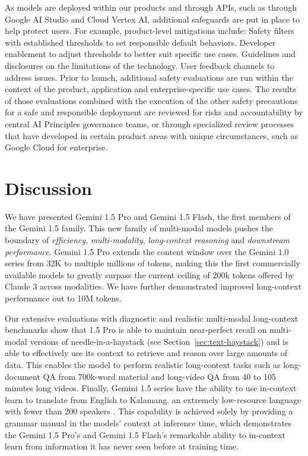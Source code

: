 As models are deployed within our products and through APIs, such as through Google AI Studio and Cloud Vertex AI, additional safeguards  are put in place to help protect users. For example, product-level mitigations include: Safety filters with established thresholds to set responsible default behaviors. Developer enablement to adjust thresholds to better suit specific use cases. Guidelines and disclosures on the limitations of the technology. User feedback channels to address issues. Prior to launch, additional safety evaluations are run within the context of the product, application and enterprise-specific use cases. The results of those evaluations combined with the execution of the other safety precautions for a safe and responsible deployment are reviewed for risks and accountability by central AI Principles governance teams, or through specialized review processes that have developed in certain product areas with unique circumstances, such as Google Cloud for enterprise. 

\section{Discussion}
\label{discussion}

We have presented Gemini 1.5 Pro and Gemini 1.5 Flash, the first members of the Gemini 1.5 family. This new family of multi-modal models pushes the boundary of \textit{efficiency}, \textit{multi-modality}, \textit{long-context reasoning} and \textit{downstream performance}. Gemini 1.5 Pro extends the content window over the Gemini 1.0 series from 32K to multiple millions of tokens, making this the first commercially available models to greatly surpass the current ceiling of 200k tokens offered by Claude 3 across modalities. We have further demonstrated improved long-context performance out to 10M tokens.

Our extensive evaluations with diagnostic and realistic multi-modal long-context benchmarks show that 1.5 Pro is able to maintain near-perfect recall on multi-modal versions of needle-in-a-haystack (see Section~\ref{sec:text-haystack}) and is able to effectively use its context to retrieve and reason over large amounts of data. This enables the model to perform realistic long-context tasks such as long-document QA from 700k-word material and long-video QA from 40 to 105 minutes long videos. Finally, Gemini 1.5 series have the ability to use in-context learn to translate from English to Kalamang, an extremely low-resource language with fewer than 200 speakers \citep{visser2020grammar}. This capability is achieved solely by providing a grammar manual in the models' context at inference time, which demonstrates the Gemini 1.5 Pro's and Gemini 1.5 Flash's remarkable ability to in-context learn from information it has never seen before at training time.

